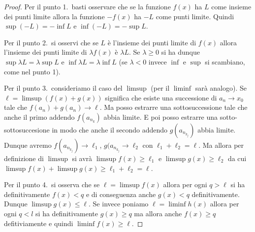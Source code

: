 \begin{proof}
  Per il punto 1.\ basti osservare che se la funzione $f(x)$ ha $L$ come
  insieme dei punti limite allora la funzione $-f(x)$ ha $-L$ come punti
  limite. Quindi $\sup (-L) = -\inf L$ e $\inf(-L) = -\sup L$.

  Per il punto 2.\ si osservi che se $L$ è l'insieme dei punti limite
  di $f(x)$ allora l'insieme dei punti limite di $\lambda f(x)$ è $\lambda L$.
  Se $\lambda \ge 0$ si ha dunque $\sup \lambda L = \lambda \sup L$
  e $\inf \lambda L = \lambda \inf L$ (se $\lambda<0$ invece $\inf$ e $\sup$
  si scambiano, come nel punto 1).

  Per il punto 3.\ consideriamo il caso del $\limsup$ (per il $\liminf$ sarà analogo).
  Se $\ell = \limsup(f(x)+g(x))$ significa che esiste una successione
  di $a_n\to x_0$ tale che $f(a_n)+g(a_n)\to \ell$. 
  Ma posso estrarre una sottosuccessione
  tale che anche il primo addendo $f(a_{n_k})$ abbia limite. 
  E poi posso estrarre
  una sotto-sottosuccesione in modo che anche il secondo addendo $g(a_{n_{k_j}})$
  abbia limite. 
  Dunque avremo $f(a_{n_{k_j}}) \to \ell_1$, $g(a_{n_{k_j}} \to \ell_2$
  con $\ell_1+\ell_2=\ell$.
  Ma allora per definizione di $\limsup$ si avrà $\limsup f(x) \ge \ell_1$
  e $\limsup g(x) \ge \ell_2$ da cui $\limsup f(x) + \limsup g(x) \ge \ell_1+\ell_2 = \ell$.

  Per il punto 4.\ si osserva che se $\ell = \limsup f(x)$ allora
  per ogni $q>\ell$ si ha definitivamente
  $f(x)<q$ e di conseguenza anche $g(x) < q$ definitivamente.
  Dunque $\limsup g(x) \le \ell$.
  Se invece poniamo $\ell = \liminf h(x)$ allora
  per ogni $q<l$ si ha definitivamente $g(x) \ge q$ ma
  allora anche $f(x)\ge q$ defitiviamente e quindi
  $\liminf f(x) \ge \ell$.
\end{proof}

